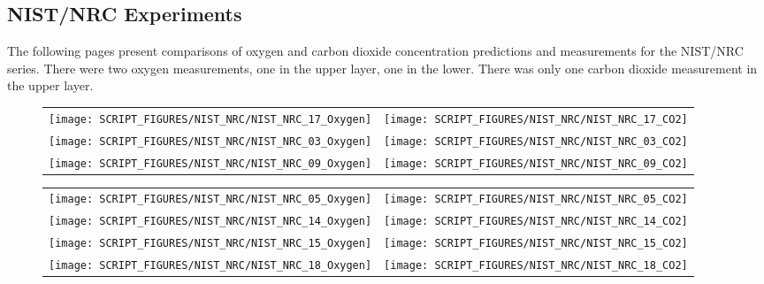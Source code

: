 \clearpage

\subsection{NIST/NRC Experiments}

The following pages present comparisons of oxygen and carbon dioxide concentration predictions and measurements for the
NIST/NRC series. There were two oxygen measurements, one in the upper layer, one in the lower.  There was only one carbon
dioxide measurement in the upper layer.

\begin{figure}[h]
\begin{tabular*}{\textwidth}{l@{\extracolsep{\fill}}r}
\texttt{[image: SCRIPT\_FIGURES/NIST\_NRC/NIST\_NRC\_17\_Oxygen]} &
\texttt{[image: SCRIPT\_FIGURES/NIST\_NRC/NIST\_NRC\_17\_CO2]} \\
\texttt{[image: SCRIPT\_FIGURES/NIST\_NRC/NIST\_NRC\_03\_Oxygen]} &
\texttt{[image: SCRIPT\_FIGURES/NIST\_NRC/NIST\_NRC\_03\_CO2]} \\
\texttt{[image: SCRIPT\_FIGURES/NIST\_NRC/NIST\_NRC\_09\_Oxygen]} &
\texttt{[image: SCRIPT\_FIGURES/NIST\_NRC/NIST\_NRC\_09\_CO2]}
\end{tabular*}
\label{NIST_NRC_Gas_Open_1}
\end{figure}

\newpage

\begin{figure}[p]
\begin{tabular*}{\textwidth}{l@{\extracolsep{\fill}}r}
\texttt{[image: SCRIPT\_FIGURES/NIST\_NRC/NIST\_NRC\_05\_Oxygen]} &
\texttt{[image: SCRIPT\_FIGURES/NIST\_NRC/NIST\_NRC\_05\_CO2]} \\
\texttt{[image: SCRIPT\_FIGURES/NIST\_NRC/NIST\_NRC\_14\_Oxygen]} &
\texttt{[image: SCRIPT\_FIGURES/NIST\_NRC/NIST\_NRC\_14\_CO2]} \\
\texttt{[image: SCRIPT\_FIGURES/NIST\_NRC/NIST\_NRC\_15\_Oxygen]} &
\texttt{[image: SCRIPT\_FIGURES/NIST\_NRC/NIST\_NRC\_15\_CO2]} \\
\texttt{[image: SCRIPT\_FIGURES/NIST\_NRC/NIST\_NRC\_18\_Oxygen]} &
\texttt{[image: SCRIPT\_FIGURES/NIST\_NRC/NIST\_NRC\_18\_CO2]}
\end{tabular*}
\label{NIST_NRC_Gas_Open_2}
\end{figure}

